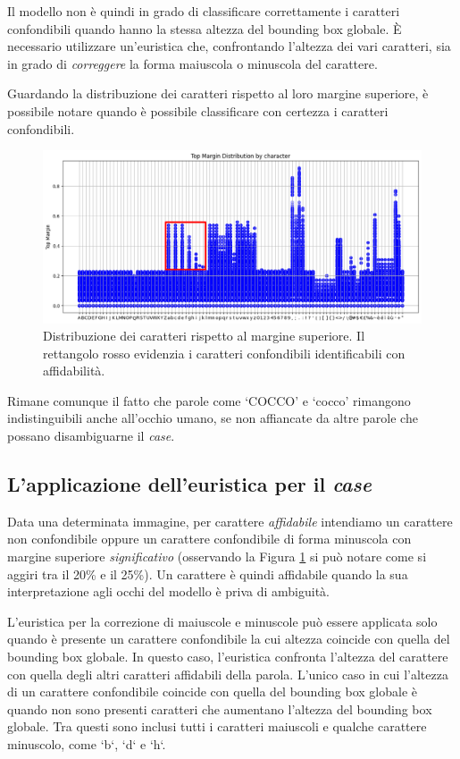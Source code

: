 Il modello non è quindi in grado di classificare correttamente i caratteri confondibili quando hanno la stessa altezza del bounding box globale.
È necessario utilizzare un'euristica che, confrontando l'altezza dei vari caratteri, sia in grado di \emph{correggere} la forma maiuscola o minuscola del carattere.

Guardando la distribuzione dei caratteri rispetto al loro margine superiore, è possibile notare quando è possibile classificare con certezza i caratteri confondibili.

\begin{figure}[H]
	\centering
	\includegraphics[width=1\textwidth]{images/top_margin_distribution_highlight.png}
	\caption{Distribuzione dei caratteri rispetto al margine superiore. Il rettangolo rosso evidenzia i caratteri confondibili identificabili con affidabilità.}
	\label{fig:top_margin_distribution_highlight.png}
\end{figure}

Rimane comunque il fatto che parole come `COCCO' e `cocco' rimangono indistinguibili anche all'occhio umano, se non affiancate da altre parole che possano disambiguarne il \emph{case}.

\subsection{L'applicazione dell'euristica per il \emph{case}}

Data una determinata immagine, per carattere \emph{affidabile} intendiamo un carattere non confondibile oppure un carattere confondibile di forma minuscola con margine superiore \emph{significativo} (osservando la Figura \ref{fig:top_margin_distribution_highlight.png} si può notare come si aggiri tra il 20\% e il 25\%). Un carattere è quindi affidabile quando la sua interpretazione agli occhi del modello è priva di ambiguità.

L'euristica per la correzione di maiuscole e minuscole può essere applicata solo quando è presente un carattere confondibile la cui altezza coincide con quella del bounding box globale. In questo caso, l'euristica confronta l'altezza del carattere con quella degli altri caratteri affidabili della parola.
L'unico caso in cui l'altezza di un carattere confondibile coincide con quella del bounding box globale è quando non sono presenti caratteri che aumentano l'altezza del bounding box globale. Tra questi sono inclusi tutti i caratteri maiuscoli e qualche carattere minuscolo, come `b`, `d` e `h`.


